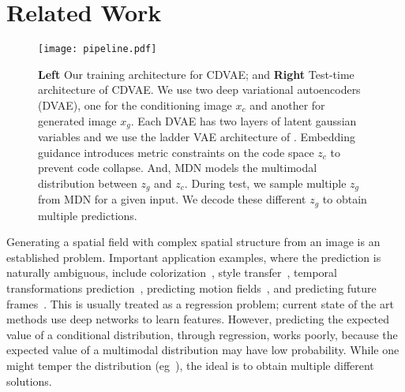 \documentclass[10pt,twocolumn,letterpaper]{article}
\begin{document}
\section{Related Work}

\begin{figure*}[ht]
\centerline{  \texttt{[image: pipeline.pdf]}}
  \caption{{\bf Left} Our training architecture for CDVAE; and {\bf Right} Test-time architecture
   of CDVAE. We use two deep variational autoencoders (DVAE), one for the conditioning image $x_c$ and 
   another for generated image $x_g$. Each DVAE has two layers of latent gaussian variables and we 
   use the ladder VAE architecture of \cite{sonderby2016ladder}. Embedding guidance introduces
   metric constraints on the code space $z_c$ to prevent code collapse. And, MDN models the multimodal
   distribution between $z_g$ and $z_c$. During test, we sample multiple $z_g$ from MDN for a given 
   input. We decode these different $z_g$ to obtain multiple predictions.}
  \label{fig:architecture}
\end{figure*}

Generating a spatial field with complex spatial structure from an image is an established problem. Important application
examples, where the prediction is naturally ambiguous, include
colorization~\cite{deshpande2015learning,larsson2016learning, zhang2016colorful}, style transfer~\cite{gatys2015neural},  
temporal transformations prediction~\cite{zhou2016learning}, predicting
motion fields~\cite{sohn2015learning,walker2016uncertain,xue2016visual}, and predicting future
frames~\cite{vondrick2015anticipating}.  
This is usually treated as a regression problem; current state of the art methods use deep networks to learn features. 
However, predicting the expected value of a conditional distribution, through regression, works poorly, because the expected value of a
multimodal distribution may have low probability.   While one might temper the distribution
(eg~\cite{zhang2016colorful}), the ideal is to obtain multiple different solutions.  
\end{document}
